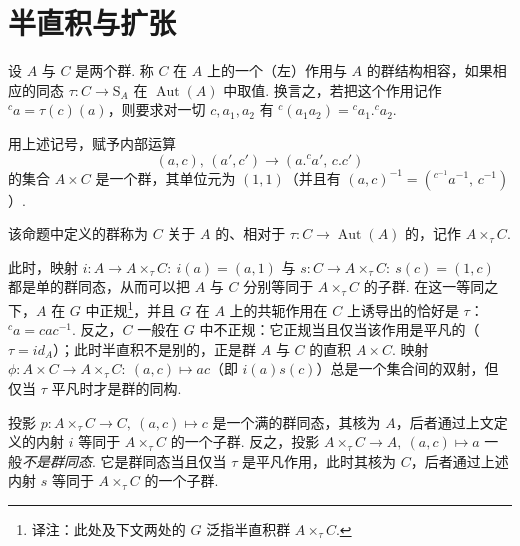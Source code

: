 \section{半直积与扩张}\label{sec:fg-2-2}
\begin{numpara}\label{np:fg-2-2-1}
设 $A$ 与 $C$ 是两个群. 称 $C$ 在 $A$ 上的一个（左）作用与 $A$ 的群结构相容，如果相应的同态 $\tau:C\longrightarrow\mathrm{S}_A$ 在 $\operatorname{Aut}(A)$ 中取值. 换言之，若把这个作用记作 ${}^{c}a=\tau(c)(a)$，则要求对一切 $c,a_1,a_2$ 有 ${}^{c}(a_1a_2)={}^{c}a_1.{}^{c}a_2$.
\end{numpara}
\begin{proposition}\label{prop:fg-2-2-2}
用上述记号，赋予内部运算
\[
(a,c),\,(a',c')\longrightarrow(a.{}^{c}a',\,c.c')
\]
的集合 $A\times C$ 是一个群，其单位元为 $(1,1)$（并且有 $(a,c)^{-1}=({}^{c^{-1}}a^{-1},\,c^{-1})$）.
\end{proposition}
该命题中定义的群称为 $C$ 关于 $A$ 的、相对于 $\tau:C\longrightarrow\operatorname{Aut}(A)$ 的，记作 $A\times_\tau C$.
\begin{numpara}[内射映射]\label{np:fg-2-2-3}
此时，映射 $i:A\longrightarrow A\times_\tau C:\ i(a)=(a,1)$ 与 $s:C\longrightarrow A\times_\tau C:\ s(c)=(1,c)$ 都是单的群同态，从而可以把 $A$ 与 $C$ 分别等同于 $A\times_\tau C$ 的子群. 在这一等同之下，$A$ 在 $G$ 中正规\footnote{译注：此处及下文两处的 $G$ 泛指半直积群 $A\times_\tau C$.}，并且 $G$ 在 $A$ 上的共轭作用在 $C$ 上诱导出的恰好是 $\tau$：${}^{c}a=cac^{-1}$. 反之，$C$ 一般在 $G$ 中不正规：它正规当且仅当该作用是平凡的（$\tau=\mathit{id}_A$）；此时半直积不是别的，正是群 $A$ 与 $C$ 的直积 $A\times C$. 映射 $\phi:A\times C\longrightarrow A\times_\tau C:\ (a,c)\mapsto ac$（即 $i(a)s(c)$）总是一个集合间的双射，但仅当 $\tau$ 平凡时才是群的同构.
\end{numpara}
\begin{numpara}[投影]\label{np:fg-2-2-4}
投影 $p:A\times_\tau C\longrightarrow C,\ (a,c)\mapsto c$ 是一个满的群同态，其核为 $A$，后者通过上文定义的内射 $i$ 等同于 $A\times_\tau C$ 的一个子群. 反之，投影 $A\times_\tau C\longrightarrow A,\ (a,c)\mapsto a$ 一般\emph{不是群同态}. 它是群同态当且仅当 $\tau$ 是平凡作用，此时其核为 $C$，后者通过上述内射 $s$ 等同于 $A\times_\tau C$ 的一个子群.
\end{numpara}
